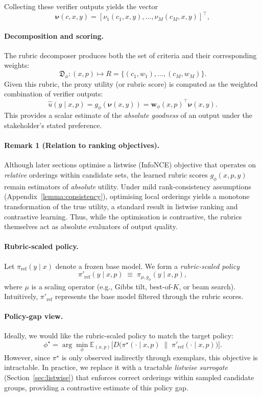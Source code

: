 \documentclass[sigconf]{acmart}
\begin{document}
 
Collecting these verifier outputs yields the vector
\[
\boldsymbol{\nu}(c,x,y)
=
[\nu_1(c_1,x,y),\dots,\nu_M(c_M,x,y)]^\top,
\]


\paragraph{Decomposition and scoring.}
The rubric decomposer produces both the set of criteria and their corresponding weights:
\[
\mathfrak{D}_\phi:(x,p)\mapsto R=\{(c_1,w_1),\dots,(c_M,w_M)\}.
\]
Given this rubric, the proxy utility (or rubric score) is computed as the weighted combination of verifier outputs:
\[
\hat u(y\mid x,p)
= g_\phi(\boldsymbol{\nu}(x,y))
= \mathbf{w}_\phi(x,p)^\top \boldsymbol{\nu}(x,y).
\]
This provides a scalar estimate of the \emph{absolute goodness} of an output under the stakeholder’s stated preference.

\paragraph{Remark 1 (Relation to ranking objectives).}
Although later sections optimise a listwise (InfoNCE) objective that operates on
\emph{relative} orderings within candidate sets, the learned rubric scores
\(g_\phi(x,p,y)\) remain estimators of \emph{absolute} utility.
Under mild rank-consistency assumptions (Appendix~\ref{lemma:consistency}),
optimising local orderings yields a monotone transformation of the true utility,
a standard result in listwise ranking and contrastive learning.  
Thus, while the optimisation is contrastive, the rubrics themselves act as
absolute evaluators of output quality.

\paragraph{Rubric-scaled policy.}
Let \(\pi_{\mathrm{ref}}(y\mid x)\) denote a frozen base model.  
We form a \emph{rubric-scaled policy}
\[
\pi'_{\mathrm{ref}}(y\mid x,p)
\;\equiv\;
\pi_{\mu,g_\phi}(y\mid x,p),
\]
where \(\mu\) is a scaling operator
(e.g., Gibbs tilt, best-of-\(K\), or beam search).  
Intuitively, \(\pi'_{\mathrm{ref}}\) represents the base model
filtered through the rubric scores.

\paragraph{Policy-gap view.}
Ideally, we would like the rubric-scaled policy to match the target policy:
\[
\phi^\star
= 
\arg\min_\phi
\mathbb{E}_{(x,p)}\!
\Big[
D\!\big(
\pi^\star(\cdot\mid x,p)
\;\|\;
\pi'_{\mathrm{ref}}(\cdot\mid x,p)
\big)
\Big].
\]
However, since \(\pi^\star\) is only observed indirectly through exemplars,
this objective is intractable.  
In practice, we replace it with a tractable \emph{listwise surrogate}
(Section~\ref{sec:listwise}) that enforces correct orderings
within sampled candidate groups, providing a contrastive estimate of this policy gap.
\end{document}
